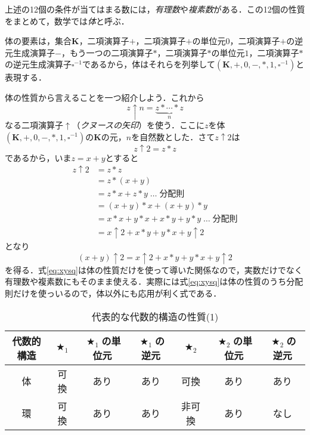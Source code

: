 \documentclass[twocolumn]{jsbook}
\newcommand{\keyword}[1]{{\emph{#1}}}
\DeclareMathOperator{\mathAnyBinaryOperator}{\bigstar}
\newcommand{\mathSomething}{\square}
\newcommand{\mathSet}[1]{\mathbf{#1}}
\newcommand{\mathField}[7]{(#1,#2,#3,#4,#5,#6,#7)}
\begin{document}
上述の12個の条件が当てはまる数には，\keyword{有理数}や\keyword{複素数}がある．この12個の性質をまとめて，数学では\keyword{体}と呼ぶ．

体の要素は，集合$\mathSet{K}$，二項演算子$+$，二項演算子$+$の単位元$0$，二項演算子$+$の逆元生成演算子$-$，もう一つの二項演算子$*$，二項演算子$*$の単位元$1$，二項演算子$*$の逆元生成演算子$\mathSomething^{-1}$であるから，体はそれらを列挙して$\mathField{\mathSet{K}}{+}{0}{-}{*}{1}{\mathSomething^{-1}}$と表現する．

体の性質から言えることを一つ紹介しよう．これから$$z\uparrow n=\underbrace{z*\dotsb*z}_n$$なる二項演算子$\uparrow$（\keyword{クヌースの矢印}）を使う．ここに$z$を体$\mathField{\mathSet{K}}{+}{0}{-}{*}{1}{\mathSomething^{-1}}$の$\mathSet{K}$の元，$n$を自然数とした．さて$z\uparrow2$は$$z\uparrow2=z*z$$であるから，いま$z=x+y$とすると
\begin{align*}
z\uparrow2&=z*z\\
&=z*(x+y)\\
&=z*x+z*y\;\dots\;\text{分配則}\\
&=(x+y)*x+(x+y)*y\\
&=x*x+y*x+x*y+y*y\;\dots\;\text{分配則}\\
&=x\uparrow2+x*y+y*x+y\uparrow2
\end{align*}
となり
\begin{equation}
\label{eq:xysq}
(x+y)\uparrow2=x\uparrow2+x*y+y*x+y\uparrow2
\end{equation}
を得る．式\eqref{eq:xysq}は体の性質だけを使って導いた関係なので，実数だけでなく有理数や複素数にもそのまま使える．実際には式\eqref{eq:xysq}は体の性質のうち分配則だけを使っいるので，体以外にも応用が利く式である．

\begin{table*}
\caption{代表的な代数的構造の性質(1)}
\label{tab:field-and-ring}
\begin{center}
\begin{tabular}{||c||c|c|c|c|c|c||}
\hline
代数的構造&$\mathAnyBinaryOperator_1$&$\mathAnyBinaryOperator_1$の単位元&$\mathAnyBinaryOperator_1$の逆元&$\mathAnyBinaryOperator_2$&$\mathAnyBinaryOperator_2$の単位元&$\mathAnyBinaryOperator_2$の逆元\\
\hline\hline
体&可換&あり&あり&可換&あり&あり\\
環&可換&あり&あり&非可換&あり&なし\\
\hline
\end{tabular}
\end{center}
\end{table*}
\end{document}
